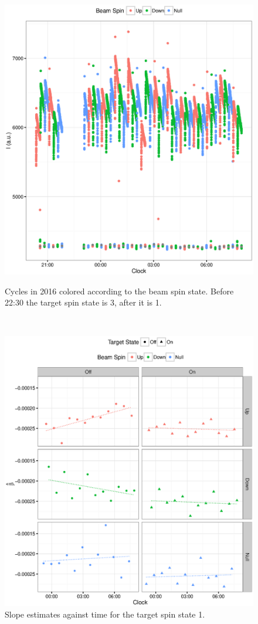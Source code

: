 \documentclass{report}
\begin{document}
\begin{figure}[h]
	\centering
	\begin{minipage}{.5\textwidth}
		\centering
		\includegraphics[scale=.5]{Cycles2016.eps}
		\caption{Cycles in 2016 colored according to the beam spin state. Before 22:30 the target spin state is 3, after it is 1.\label{fig:Cycles}}
	\end{minipage}~~
	\begin{minipage}{.5\textwidth}
		\centering
		\includegraphics[scale=.5]{Slopes2016_VS_Clock.eps}
		\caption{Slope estimates against time for the target spin state 1.\label{fig:Slopes}}
	\end{minipage}
\end{figure}	
	
\end{document}

